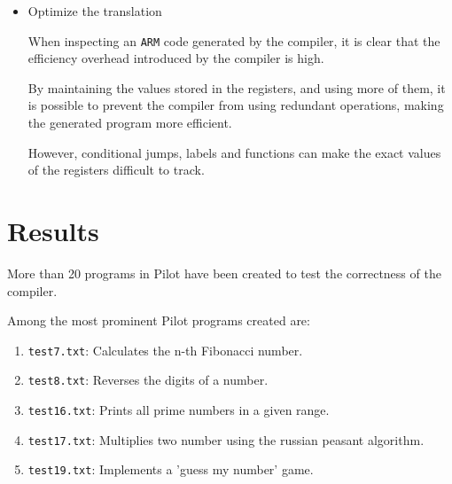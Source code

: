 \documentclass[12pt,spanish]{article}
\begin{document}
\begin{itemize}

\item{Optimize the translation}

When inspecting an \texttt{ARM} code generated by the compiler, it is clear that the efficiency overhead introduced by the compiler is high.

By maintaining the values stored in the registers, and using more of them, it is possible to prevent the compiler from using redundant operations, making the generated program more efficient.

However, conditional jumps, labels and functions can make the exact values of the registers difficult to track.

\end{itemize}

\section{Results}
More than 20 programs in Pilot have been created to test the correctness of the compiler.

\noindent
Among the most prominent Pilot programs created are:

\begin{enumerate}
\item{\texttt{test7.txt}: Calculates the n-th Fibonacci number.}
\item{\texttt{test8.txt}: Reverses the digits of a number.}
\item{\texttt{test16.txt}: Prints all prime numbers in a given range.}
\item{\texttt{test17.txt}: Multiplies two number using the russian peasant algorithm.}
\item{\texttt{test19.txt}: Implements a 'guess my number' game.}
\end{enumerate}
 
\end{document}
